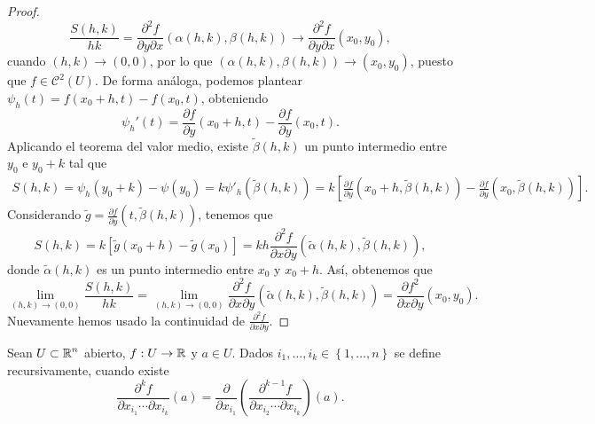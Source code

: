 \begin{proof}
\[\frac{S\left(h,k\right)}{hk} = \frac{\partial^{2}f}{\partial y \partial x}\left(\alpha\left(h,k\right), \beta\left(h,k\right)\right) \to \frac{\partial^{2}f}{\partial y\partial x}\left(x_{0}, y_{0}\right) ,\]
cuando $\displaystyle \left(h,k\right)\to \left(0,0\right) $, por lo que $\displaystyle \left(\alpha\left(h,k\right), \beta\left(h,k\right)\right)\to \left(x_{0}, y_{0}\right) $, puesto que $\displaystyle f \in \mathcal{C}^{2}\left(U\right) $.
De forma análoga, podemos plantear $\displaystyle \psi_{h}\left(t\right) = f\left(x_{0}+h, t\right)-f\left(x_{0}, t\right) $, obteniendo
\[\psi_{h}'\left(t\right)= \frac{\partial f}{\partial y}\left(x_{0}+h, t\right)-\frac{\partial f}{\partial y}\left(x_{0}, t\right) .\]
Aplicando el teorema del valor medio, existe $\displaystyle \tilde{\beta}\left(h,k\right) $ un punto intermedio entre $\displaystyle y_{0} $ e $\displaystyle y_{0} + k $ tal que
\[
\begin{split}
	S\left(h,k\right) = \psi_{h}\left(y_{0}+k\right) - \psi\left(y_{0}\right) = k \psi'_{h}\left(\tilde{\beta}\left(h,k\right)\right) = k \left[\frac{\partial f}{\partial y}\left(x_{0}+h, \tilde{\beta}\left(h,k\right)\right)- \frac{\partial f}{\partial y}\left(x_{0}, \tilde{\beta}\left(h,k\right)\right)\right]  .
\end{split}
\]
Considerando $\displaystyle \tilde{g} = \frac{\partial f}{\partial y}\left(t, \tilde{\beta}\left(h,k\right)\right) $, tenemos que 
\[S\left(h,k\right) = k \left[\tilde{g}\left(x_{0}+h\right)-\tilde{g}\left(x_{0}\right)\right] = kh \frac{\partial^{2}f}{\partial x\partial y}\left(\tilde{\alpha}\left(h,k\right), \tilde{\beta}\left(h,k\right)\right),\]
donde $\displaystyle \tilde{\alpha}\left(h,k\right) $ es un punto intermedio entre $\displaystyle x_{0} $ y $\displaystyle x_{0}+h $. Así, obtenemos que 
\[\lim_{\left(h,k\right) \to \left(0,0\right)}\frac{S\left(h,k\right)}{hk} = \lim_{\left(h,k\right) \to \left(0,0\right)} \frac{\partial^{2}f}{\partial x\partial y}\left(\tilde{\alpha}\left(h,k\right), \tilde{\beta}\left(h,k\right)\right) = \frac{\partial f^{2}}{\partial x \partial y}\left(x_{0}, y_{0}\right) .\]
Nuevamente hemos usado la continuidad de $\displaystyle \frac{\partial^{2}f}{\partial x \partial y} $. 
\end{proof}
\begin{definition}
	Sean $\displaystyle U \subset \mathbb{R}^{n} $ abierto, $\displaystyle f : U \to \mathbb{R} $ y $\displaystyle a \in U $. Dados $\displaystyle i_{1}, \ldots, i_{k} \in \left\{ 1, \ldots, n\right\}  $ se define recursivamente, cuando existe
	\[\frac{\partial ^{k}f}{\partial x_{i_{1}} \cdots \partial x_{i_{k}}}\left(a\right) = \frac{\partial }{\partial x_{i_{1}}}\left(\frac{\partial^{k-1}f}{\partial x_{i_{2}} \cdots \partial x_{i_{k}}} \right)\left(a\right) .\]	
\end{definition}
